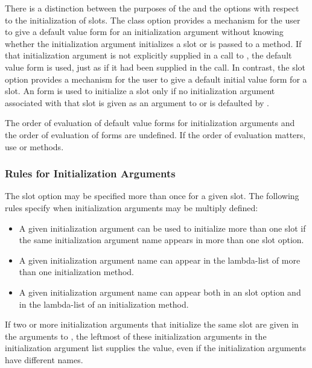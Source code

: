 There is a distinction between the purposes of the 
 and the  options with respect to the
initialization of slots.  The  class option
provides a mechanism for the user to give a default  value form
for an initialization argument without knowing whether the
initialization argument initializes a slot or is passed to a method.
If that initialization argument is not explicitly supplied in a call
to , the default  value form is used, just
as if it had been supplied in the call.  In contrast, the 
 slot option provides a mechanism for the user to give a
default initial value form for a slot.  An  form is
used to initialize a slot only if no initialization argument
associated with that slot is given as an argument to 
 or is defaulted by .

The order of evaluation of default value forms for initialization
arguments and the order of evaluation of  forms are
undefined.  If the order of evaluation matters, use
 or  methods.

\subsubsection{Rules for Initialization Arguments}
\label{Rules-for-Initialization-Arguments-SECTION}

The  slot option may be specified more than
once for a given slot.
The following rules specify when initialization arguments may be
multiply defined:

\begin{itemize}
\item  A given initialization argument can be used to
initialize more than one slot if the same initialization argument name
appears in more than one  slot option.

\item  A given initialization argument name can appear 
in the lambda-list of more than one initialization method.

\item  A given initialization argument name can
appear both in an  slot option and in the lambda-list
of an initialization method.
\end{itemize}

If two or more initialization arguments that initialize
the same slot are given in the arguments to , the
leftmost of these initialization arguments in the initialization
argument list supplies the value, even if the initialization arguments
have different names.

